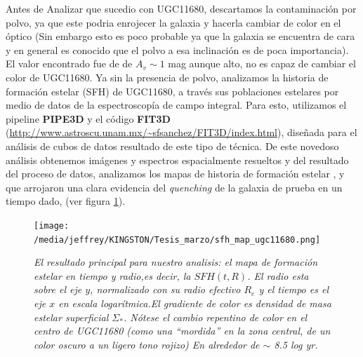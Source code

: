\documentclass[12pt]{article}
\begin{document}
Antes de Analizar que sucedio con UGC11680, descartamos la contaminación por polvo, ya que este podria enrojecer la galaxia y hacerla cambiar de color en el óptico (Sin embargo esto es poco probable ya que la galaxia se encuentra de cara y en general es conocido que el polvo a esa inclinación es de poca importancia). El valor encontrado fue de de $A_v \sim 1 $ mag  aunque alto, no es capaz de cambiar el color de UGC11680. Ya sin la presencia de polvo, analizamos la historia de formación estelar (SFH) de UGC11680, a través sus poblaciones estelares por medio de datos de la espectroscopía de campo integral. Para esto, utilizamos el pipeline \textbf{PIPE3D} y el código \textbf{FIT3D} (\url{http://www.astroscu.unam.mx/~sfsanchez/FIT3D/index.html}), diseñada para el análisis de cubos de datos resultado de este tipo de técnica. De este novedoso análisis obtenemos imágenes y espectros  espacialmente resueltos y del resultado del proceso de datos, analizamos los mapas de historia de formación estelar \cite{cid2013_1}, y que arrojaron una clara evidencia del \textsl{quenching}
de la  galaxia de prueba en un tiempo dado, (ver figura \ref{ugc11680}).


\begin{figure}[ht]
  \centering
  \texttt{[image: /media/jeffrey/KINGSTON/Tesis\_marzo/sfh\_map\_ugc11680.png]}
  \caption[spectra]
   {\small \textsl{El resultado principal para nuestro analisis: el mapa de formación estelar en tiempo y radio,es decir, la $SFH(t,R)$. El radio esta sobre el eje $y$, normalizado con su radio efectivo  $R_e$ y el tiempo es el eje $x$ en escala logarítmica.El gradiente de color es densidad de masa estelar superficial  $\Sigma_{*}$. Nótese el cambio repentino de color en el centro de UGC11680  (como una ``mordida''  en la zona central, de un color oscuro a un ligero tono rojizo) En alrededor de $\sim$ 8.5 log yr.}}
\label{ugc11680}
\end{figure}
\end{document}
